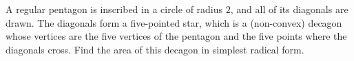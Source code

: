 A regular pentagon is inscribed in a circle of radius $2$, and all of its diagonals are drawn. The diagonals form a five-pointed star, which is a (non-convex) decagon whose vertices are the five vertices of the pentagon and the five points where the diagonals cross. Find the area of this decagon in simplest radical form.
